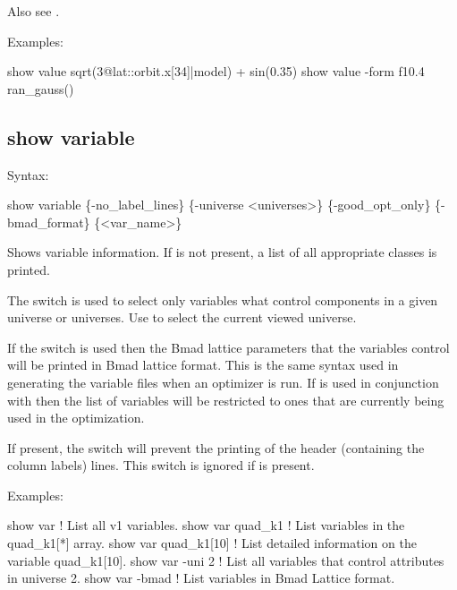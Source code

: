 {{{{{{{{{Also see . 

Examples:
\begin{example}
  show value sqrt(3@lat::orbit.x[34]|model) + sin(0.35)
  show value -form f10.4 ran_gauss()
\end{example}



\subsection{show variable}
\label{s:show.variable}

Syntax:
\begin{example}
  show variable \{-no_label_lines\} \{-universe <universes>\}            
         \{-good_opt_only\} \{-bmad_format\} \{<var_name>\}
\end{example}


Shows variable information. If  is not present, a list of all appropriate 
classes is printed.

The  switch is used to select only variables what control components in a given
universe or universes. Use  to select the current viewed universe.

If the  switch is used then the Bmad lattice parameters that the \tao variables
control will be printed in Bmad lattice format. This is the same syntax used in generating the
variable files when an optimizer is run. If  is used in conjunction with
 then the list of variables will be restricted to ones that are currently being
used in the optimization.

If present, the  switch will prevent the printing of the header (containing the
column labels) lines. This switch is ignored if  is present.

Examples:
\begin{example}
  show var             ! List all v1 variables.
  show var quad_k1     ! List variables in the quad_k1[*] array.
  show var quad_k1[10] ! List detailed information on the variable quad_k1[10].
  show var -uni 2      ! List all variables that control attributes in universe 2.
  show var -bmad       ! List variables in Bmad Lattice format.
\end{example}


}}}}}}}}}
